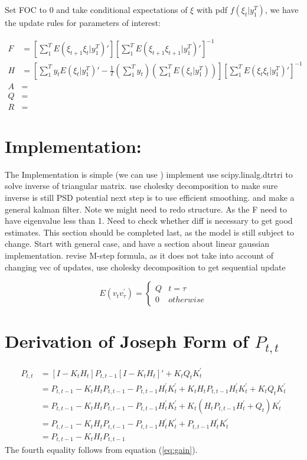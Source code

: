 \documentclass[12pt]{article}
\numberwithin{equation}{section}
\begin{document}
Set FOC to 0 and take conditional expectations of $\xi$ with pdf $f(\xi_t|y_1^T)$, we have the update rules for parameters of interest:

\begin{align}
    F &= \left[\sum_1^{T}E(\xi_{t+1}\xi_{t}|y_1^T)'\right] \left[\sum_1^{T}E(\xi_{t+1}\xi_{t+1}|y_1^T)'\right]^{-1} \\
    H &= \left[\sum_1^{T}y_tE(\xi_{t}|y_1^T)' - \frac{1}{T}\left(\sum_1^Ty_t\right)\left(\sum_1^TE(\xi_t|y_1^T)\right)\right] 
    \left[\sum_1^{T}E(\xi_{t}\xi_{t}|y_1^T)'\right]^{-1} \\
    A &= \\
    Q &= \\
    R &= 
\end{align}
\section{Implementation:} \label{sec:implement}
The Implementation is simple (we can use )
implement
use scipy.linalg.dtrtri to solve inverse of triangular matrix.
use cholesky decomposition to make sure inverse is still PSD
potential next step is to use efficient smoothing.
and make a general kalman filter. 
Note we might need to redo structure. As the F need to have eigenvalue less than 1. Need to check whether diff is necessary to get good estimates. This section should be completed last, as the model is still subject to change.
Start with general case, and have a section about linear gaussian implementation.
revise M-step formula, as it does not take into account of changing vec of updates, use cholesky decomposition to get sequential update 

\[
    E(v_{t}v_{\tau}^{'})=\begin{cases}
        Q & t=\tau \\
        0 & otherwise
    \end{cases} 
\]
\printbibliography
\appendix
\section{Derivation of Joseph Form of $P_{t,t}$} \label{ap:joseph}
\begin{align*}
    P_{t,t} &= [I - K_tH_t]P_{t,t-1}[I - K_tH_t]' + K_tQ_tK_t^{'} \\
    &= P_{t,t-1} - K_tH_tP_{t,t-1} - P_{t,t-1}H_t^{'}K_t^{'} + K_tH_tP_{t,t-1}H_t^{'}K_t^{'} + K_tQ_tK_t^{'} \\
    &= P_{t,t-1} - K_tH_tP_{t,t-1} - P_{t,t-1}H_t^{'}K_t^{'} + K_t(H_tP_{t,t-1}H_t^{'} + Q_t)K_t^{'} \\
    &= P_{t,t-1} - K_tH_tP_{t,t-1} - P_{t,t-1}H_t^{'}K_t^{'} + P_{t,t-1}H_t^{'}K_t^{'} \\
    &= P_{t,t-1} - K_tH_tP_{t,t-1}
\end{align*}
The fourth equality follows from equation (\ref{eq:gain}). 
\end{document}
